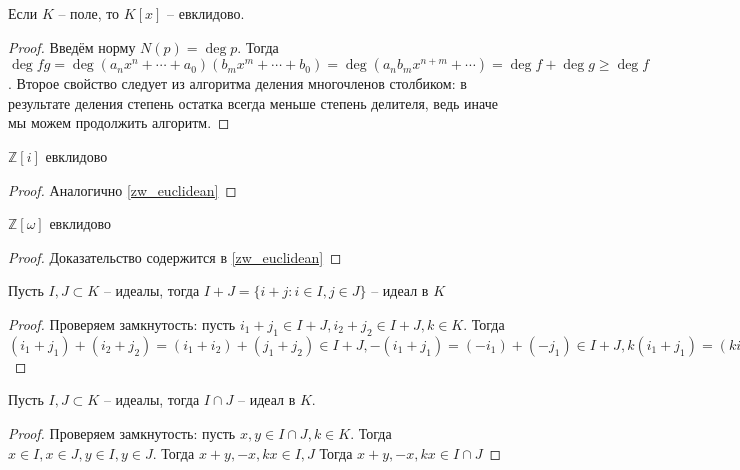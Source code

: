 \documentclass{article}
\begin{document}
\begin{statement}
    Если $K$ -- поле, то $K[x]$ -- евклидово.
\end{statement}

\begin{proof}
    Введём норму $N(p) = \deg p$. Тогда $\deg fg = \deg (a_nx^n + \cdots + a_0)(b_mx^m + \cdots + b_0) = \deg (a_n b_m
    x^{n + m} + \cdots) = \deg f + \deg g \geq \deg f$. Второе свойство следует из алгоритма деления многочленов
    столбиком: в результате деления степень остатка всегда меньше степень делителя, ведь иначе мы можем продолжить
    алгоритм.
\end{proof}

\begin{statement}
    $\mathbb{Z}[i]$ евклидово
\end{statement}

\begin{proof}
    Аналогично \ref{zw_euclidean}
\end{proof}

\begin{statement}
    $\mathbb{Z}[\omega]$ евклидово
\end{statement}

\begin{proof}
    Доказательство содержится в \ref{zw_euclidean}
\end{proof}

\begin{statement}
    Пусть $I, J \subset K$ -- идеалы, тогда $I + J = \{i + j : i \in I, j \in J\}$ -- идеал в $K$
\end{statement}

\begin{proof}
    Проверяем замкнутость: пусть $i_1 + j_1 \in I + J, i_2 + j_2 \in I + J, k \in K$. Тогда $(i_1 + j_1) + (i_2 + j_2) =
    (i_1 + i_2) + (j_1 + j_2) \in I + J, -(i_1 + j_1) = (-i_1) + (-j_1) \in I + J, k(i_1 + j_1) = (ki_1) + (kj_1) \in I
    + J$
\end{proof}

\begin{statement}
    Пусть $I, J \subset K$ -- идеалы, тогда $I \cap J$ -- идеал в $K$.
\end{statement}

\begin{proof}
    Проверяем замкнутость: пусть $x, y \in I \cap J, k \in K$. Тогда $x \in I, x \in J, y \in I, y \in J$. Тогда $x + y,
    -x, kx \in I, J$ Тогда $x + y, -x, kx \in I \cap J$
\end{proof}
\end{document}
